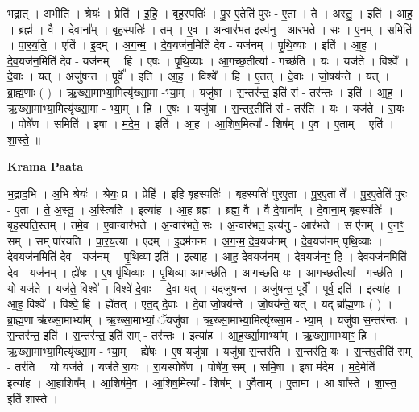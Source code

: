 \documentclass[17pt]{extarticle}
\begin{document}
भ॒द्रात् । अ॒भीति॑ । श्रेयः॑ । प्रेति॑ । इ॒हि॒ । बृह॒स्पतिः॑ । पु॒र॒ ए॒तेति॑ पुरः - ए॒ता । ते॒ । अ॒स्तु॒ । इति॑ । आ॒ह॒ । ब्रह्म॑ । वै । दे॒वाना᳚म् । बृह॒स्पतिः॑ । तम् । ए॒व । अ॒न्वार॑भत॒ इत्य॑नु - आर॑भते । सः । ए॒न॒म् । समिति॑ । पा॒र॒य॒ति॒ । एति॑ । इ॒दम् । अ॒ग॒न्म॒ । दे॒व॒यज॑न॒मिति॑ देव - यज॑नम् । पृ॒थि॒व्याः । इति॑ । आ॒ह॒ । दे॒व॒यज॑न॒मिति॑ देव - यज॑नम् । हि । ए॒षः । पृ॒थि॒व्याः । आ॒गच्छ॒तीत्या᳚ - गच्छ॑ति । यः । यज॑ते । विश्वे᳚ । दे॒वाः । यत् । अजु॑षन्त । पूर्वे᳚ । इति॑ । आ॒ह॒ । विश्वे᳚ । हि । ए॒तत् । दे॒वाः । जो॒षय॑न्ते । यत् । ब्रा॒ह्म॒णाः ( ) । ऋ॒ख्सा॒माभ्या॒मित्यृ॑ख्सा॒मा -भ्या॒म् । यजु॑षा । स॒न्तर॑न्त॒ इति॑ सं - तर॑न्तः । इति॑ । आ॒ह॒ । ऋ॒ख्सा॒माभ्या॒मित्यृ॑ख्सा॒मा - भ्या॒म् । हि । ए॒षः । यजु॑षा । स॒न्तर॒तीति॑ सं - तर॑ति । यः । यज॑ते । रा॒यः । पोषे॑ण । समिति॑ । इ॒षा । म॒दे॒म॒ । इति॑ । आ॒ह॒ । आ॒शिष॒मित्या᳚ - शिष᳚म् । ए॒व । ए॒ताम् । एति॑ । शा॒स्ते॒ ॥  \newline


\textbf{Krama Paata} \newline

भ॒द्राद॒भि । अ॒भि श्रेयः॑ । श्रेयः॒ प्र । प्रेहि॑ । इ॒हि॒ बृह॒स्पतिः॑ । बृह॒स्पतिः॑ पुरए॒ता । पु॒र॒ए॒ता ते᳚ । पु॒र॒ए॒तेति॑ पुरः - ए॒ता । ते॒ अ॒स्तु॒ । अ॒स्त्विति॑ । इत्या॑ह । आ॒ह॒ ब्रह्म॑ । ब्रह्म॒ वै । वै दे॒वाना᳚म् । दे॒वाना॒म् बृह॒स्पतिः॑ । बृह॒स्पति॒स्तम् । तमे॒व । ए॒वान्वार॑भते । अ॒न्वार॑भते॒ सः । अ॒न्वार॑भत॒ इत्य॑नु - आर॑भते । स ए॑नम् । ए॒नꣳ॒॒ सम् । सम् पा॑रयति । पा॒र॒य॒त्या । एदम् । इ॒दम॑गन्म । अ॒ग॒न्म॒ दे॒व॒यज॑नम् । दे॒व॒यज॑नम् पृथि॒व्याः । दे॒व॒यज॑न॒मिति॑ देव - यज॑नम् । पृ॒थि॒व्या इति॑ । इत्या॑ह । आ॒ह॒ दे॒व॒यज॑नम् । दे॒व॒यज॑नꣳ॒॒ हि । दे॒व॒यज॑न॒मिति॑ देव - यज॑नम् । ह्ये॑षः । ए॒ष पृ॑थि॒व्याः । पृ॒थि॒व्या आ॒गच्छ॑ति । आ॒गच्छ॑ति॒ यः । आ॒गच्छ॒तीत्या᳚ - गच्छ॑ति । यो यज॑ते । यज॑ते॒ विश्वे᳚ । विश्वे॑ दे॒वाः । दे॒वा यत् । यदजु॑षन्त । अजु॑षन्त॒ पूर्वे᳚ । पूर्व॒ इति॑ । इत्या॑ह । आ॒ह॒ विश्वे᳚ । विश्वे॒ हि । ह्ये॑तत् । ए॒त॒द् दे॒वाः । दे॒वा जो॒षय॑न्ते । जो॒षय॑न्ते॒ यत् । यद् ब्रा᳚ह्म॒णाः ( ) । ब्रा॒ह्म॒णा ऋ॑ख्सा॒माभ्या᳚म् । ऋ॒ख्सा॒माभ्यां॒ ॅयजु॑षा । ऋ॒ख्सा॒माभ्या॒मित्यृ॑ख्सा॒म - भ्या॒म् । यजु॑षा स॒न्तर॑न्तः । स॒न्तर॑न्त॒ इति॑ । स॒न्तर॑न्त॒ इति॑ सम् - तर॑न्तः । इत्या॑ह । आ॒ह॒र्ख्सा॒माभ्या᳚म् । ऋ॒ख्सा॒माभ्याꣳ॒॒ हि । ऋ॒ख्सा॒माभ्या॒मित्यृ॑ख्सा॒म - भ्या॒म् । ह्ये॑षः । ए॒ष यजु॑षा । यजु॑षा स॒न्तर॑ति । स॒न्तर॑ति॒ यः । स॒न्तर॒तीति॑ सम् - तर॑ति । यो यज॑ते । यज॑ते रा॒यः । रा॒यस्पोषे॑ण । पोषे॑ण॒ सम् । समि॒षा । इ॒षा म॑देम । म॒दे॒मेति॑ । इत्या॑ह । आ॒हा॒शिष᳚म् । आ॒शिष॑मे॒व । आ॒शिष॒मित्या᳚ - शिष᳚म् । ए॒वैताम् । ए॒तामा । आ शा᳚स्ते । शा॒स्त॒ इति॑ शास्ते । \newline
\end{document}
